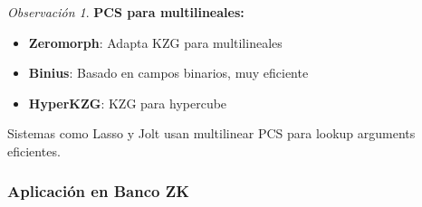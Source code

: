 \documentclass[11pt,a4paper,twoside,openright]{book}
\theoremstyle{definition}
\theoremstyle{plain}
\theoremstyle{remark}
\newtheorem{remark}{Observación}[chapter]
\begin{document}
\begin{remark}
\textbf{PCS para multilineales:}
\begin{itemize}
    \item \textbf{Zeromorph}: Adapta KZG para multilineales
    \item \textbf{Binius}: Basado en campos binarios, muy eficiente
    \item \textbf{HyperKZG}: KZG para hypercube
\end{itemize}

Sistemas como Lasso y Jolt usan multilinear PCS para lookup arguments eficientes.
\end{remark}

\subsubsection{Aplicación en Banco ZK}
\end{document}
